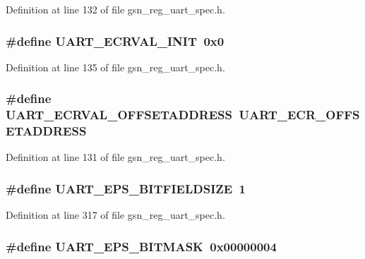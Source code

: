 Definition at line 132 of file gsn\_\-reg\_\-uart\_\-spec.h.

\hypertarget{a00575_a4e6eaa8cdd0674bf1f04d7d744c3cbdc}{
\subsubsection[{UART\_\-ECRVAL\_\-INIT}]{\setlength{\rightskip}{0pt plus 5cm}\#define UART\_\-ECRVAL\_\-INIT~0x0}}
\label{a00575_a4e6eaa8cdd0674bf1f04d7d744c3cbdc}


Definition at line 135 of file gsn\_\-reg\_\-uart\_\-spec.h.

\hypertarget{a00575_aac92bcfaf3ccdf72b0fe7630ad171f78}{
\subsubsection[{UART\_\-ECRVAL\_\-OFFSETADDRESS}]{\setlength{\rightskip}{0pt plus 5cm}\#define UART\_\-ECRVAL\_\-OFFSETADDRESS~UART\_\-ECR\_\-OFFSETADDRESS}}
\label{a00575_aac92bcfaf3ccdf72b0fe7630ad171f78}


Definition at line 131 of file gsn\_\-reg\_\-uart\_\-spec.h.

\hypertarget{a00575_a715a9cafac82a74d690bd77dcca5c623}{
\subsubsection[{UART\_\-EPS\_\-BITFIELDSIZE}]{\setlength{\rightskip}{0pt plus 5cm}\#define UART\_\-EPS\_\-BITFIELDSIZE~1}}
\label{a00575_a715a9cafac82a74d690bd77dcca5c623}


Definition at line 317 of file gsn\_\-reg\_\-uart\_\-spec.h.

\hypertarget{a00575_ac1b9720cbe1668b77ad7090f36ac93bd}{
\subsubsection[{UART\_\-EPS\_\-BITMASK}]{\setlength{\rightskip}{0pt plus 5cm}\#define UART\_\-EPS\_\-BITMASK~0x00000004}}
\label{a00575_ac1b9720cbe1668b77ad7090f36ac93bd}


